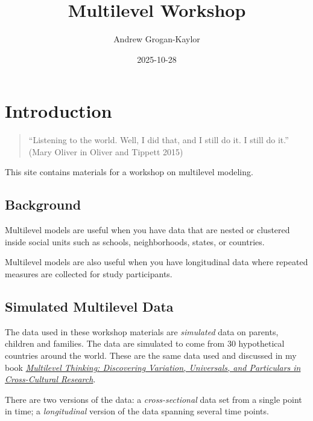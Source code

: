 \documentclass[
  letterpaper,
  DIV=11,
  numbers=noendperiod]{scrreprt}
\title{Multilevel Workshop}
\author{Andrew Grogan-Kaylor}
\date{2025-10-28}
\renewcommand*\contentsname{Table of contents}
\newcommand\contentsname{Table of contents}
\begin{document}
\maketitle

\renewcommand*\contentsname{Table of contents}
{
\hypersetup{linkcolor=}
\setcounter{tocdepth}{2}
\tableofcontents
}
\listoffigures
\listoftables


\chapter{Introduction}\label{introduction}

\begin{quote}
``Listening to the world. Well, I did that, and I still do it. I still
do it.'' (Mary Oliver in Oliver and Tippett 2015)
\end{quote}

This site contains materials for a workshop on multilevel modeling.

\section{Background}\label{background}

Multilevel models are useful when you have data that are nested or
clustered inside social units such as schools, neighborhoods, states, or
countries.

Multilevel models are also useful when you have longitudinal data where
repeated measures are collected for study participants.

\section{Simulated Multilevel Data}\label{simulated-multilevel-data}

The data used in these workshop materials are \emph{simulated} data on
parents, children and families. The data are simulated to come from 30
hypothetical countries around the world. These are the same data used
and discussed in my book
\emph{\href{https://academic.oup.com/book/60530}{Multilevel Thinking:
Discovering Variation, Universals, and Particulars in Cross-Cultural
Research}}.

There are two versions of the data: a \emph{cross-sectional} data set
from a single point in time; a \emph{longitudinal} version of the data
spanning several time points.
\end{document}
